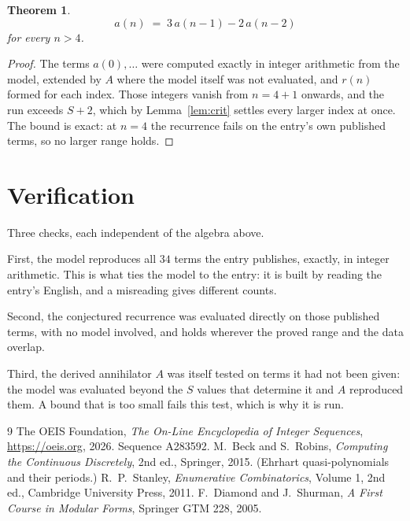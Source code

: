 \documentclass[11pt,a4paper]{article}
\theoremstyle{plain}
\newtheorem{theorem}{Theorem}
\theoremstyle{definition}
\begin{document}
\begin{theorem}
\[
a(n)\;=\;3\,a(n-1) - 2\,a(n-2)
\]
for every $n>4$.
\end{theorem}

\begin{proof}
The terms $a(0),\dots$ were computed exactly in integer arithmetic from the model, extended by
$A$ where the model itself was not evaluated, and $r(n)$ formed for each index. Those integers
vanish from $n=4+1$ onwards, and the run exceeds $S+2$, which by
Lemma~\ref{lem:crit} settles every larger index at once. The bound is exact: at $n=4$ the recurrence fails on the entry's own published terms, so no larger range holds.
\end{proof}

\section{Verification}

Three checks, each independent of the algebra above.

First, the model reproduces all $34$ terms the entry publishes, exactly, in integer
arithmetic. This is what ties the model to the entry: it is built by reading the entry's
English, and a misreading gives different counts.

Second, the conjectured recurrence was evaluated directly on those published terms, with no
model involved, and holds wherever the proved range and the data overlap.

Third, the derived annihilator $A$ was itself tested on terms it had not been given: the model
was evaluated beyond the $S$ values that determine it and $A$ reproduced them. A bound that is
too small fails this test, which is why it is run.

\begin{thebibliography}{9}
 The OEIS Foundation, \emph{The On-Line Encyclopedia of Integer
Sequences}, \url{https://oeis.org}, 2026. Sequence A283592.
 M.~Beck and S.~Robins, \emph{Computing the Continuous Discretely},
2nd ed., Springer, 2015. (Ehrhart quasi-polynomials and their periods.)
 R.~P.~Stanley, \emph{Enumerative Combinatorics}, Volume 1, 2nd ed.,
Cambridge University Press, 2011.
 F.~Diamond and J.~Shurman, \emph{A First Course in Modular Forms},
Springer GTM 228, 2005.
\end{thebibliography}
\end{document}

